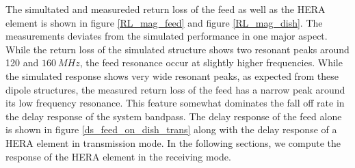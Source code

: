 \documentclass[twocolumn]{emulateapj}
\begin{document}
The simultated and measureded return loss of the feed as well as the HERA element is shown in figure \ref{RL_mag_feed} and figure \ref{RL_mag_dish}. The measurements deviates from the simulated performance in one major aspect. While the return loss of the simulated structure shows two resonant peaks around 120 and $160~MHz$, the feed resonance occur at slightly higher frequencies. While the simulated response shows very wide resonant peaks, as expected from these dipole structures, the measured return loss of the feed has a narrow peak around its low frequency resonance. This feature somewhat dominates the fall off rate in the delay response of the system bandpass. The delay response of the feed alone is shown in figure \ref{ds_feed_on_dish_trans} along with the delay response of a HERA element in transmission mode. In the following sections, we compute the response of the HERA element in the receiving mode. 
\end{document}
